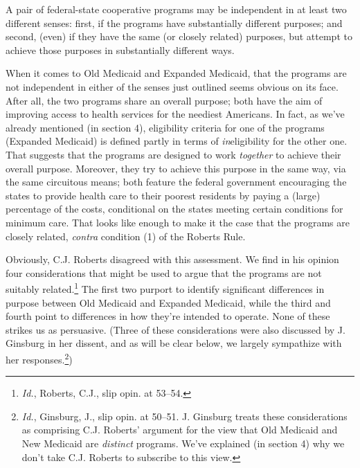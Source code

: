 \documentclass[
  10pt,
  letterpaper,
  DIV=11,
  numbers=noendperiod,
  twoside]{scrartcl}
\begin{document}
A pair of federal-state cooperative programs may be independent in at
least two different senses: first, if the programs have substantially
different purposes; and second, (even) if they have the same (or closely
related) purposes, but attempt to achieve those purposes in
substantially different ways.

When it comes to Old Medicaid and Expanded Medicaid, that the programs
are not independent in either of the senses just outlined seems obvious
on its face. After all, the two programs share an overall purpose; both
have the aim of improving access to health services for the neediest
Americans. In fact, as we've already mentioned (in section 4),
eligibility criteria for one of the programs (Expanded Medicaid) is
defined partly in terms of \emph{in}eligibility for the other one. That
suggests that the programs are designed to work \emph{together} to
achieve their overall purpose. Moreover, they try to achieve this
purpose in the same way, via the same circuitous means; both feature the
federal government encouraging the states to provide health care to
their poorest residents by paying a (large) percentage of the costs,
conditional on the states meeting certain conditions for minimum care.
That looks like enough to make it the case that the programs are closely
related, \emph{contra} condition (1) of the Roberts Rule.

Obviously, C.J. Roberts disagreed with this assessment. We find in his
opinion four considerations that might be used to argue that the
programs are not suitably related.\footnote{\emph{Id.}, Roberts, C.J.,
  slip opin. at 53--54.} The first two purport to identify significant
differences in purpose between Old Medicaid and Expanded Medicaid, while
the third and fourth point to differences in how they're intended to
operate. None of these strikes us as persuasive. (Three of these
considerations were also discussed by J. Ginsburg in her dissent, and as
will be clear below, we largely sympathize with her
responses.\footnote{\emph{Id.}, Ginsburg, J., slip opin. at 50--51. J.
  Ginsburg treats these considerations as comprising C.J. Roberts'
  argument for the view that Old Medicaid and New Medicaid are
  \emph{distinct} programs. We've explained (in section 4) why we don't
  take C.J. Roberts to subscribe to this view.})
\end{document}
